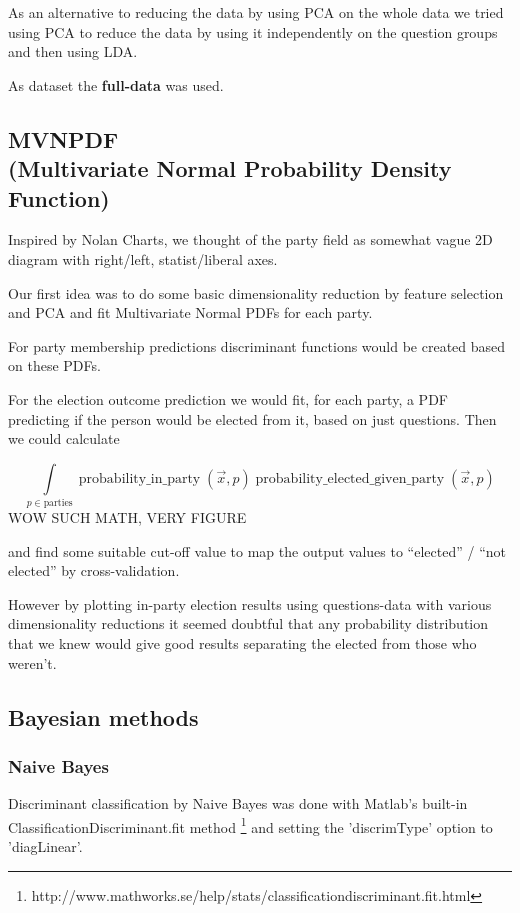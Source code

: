 \documentclass[a4paper,10pt]{article}
\begin{document}
As an alternative to reducing the data by using PCA on the whole data we tried using PCA to reduce the data by using it independently on the question groups and then using LDA.

As dataset the {\bf full-data} was used.

\subsection{MVNPDF\\ {\small (Multivariate Normal Probability Density Function)}}
Inspired by Nolan Charts, we thought of the party field as somewhat vague 2D diagram with right/left, statist/liberal axes.

Our first idea was to do some basic dimensionality reduction by feature selection and PCA and fit Multivariate Normal PDFs for each party.

For party membership predictions discriminant functions would be created based on these PDFs.

For the election outcome prediction we would fit, for each party, a PDF predicting if the person would be elected from it, based on just questions. Then we could calculate

\begin{equation}
\int\limits_{p \in \text{parties}} \operatorname{probability\_in\_party}(\vec{x}, p) \operatorname{probability\_elected\_given\_party}(\vec{x}, p)
\end{equation}
{\small WOW SUCH MATH, VERY FIGURE}

and find some suitable cut-off value to map the output values to “elected” / “not elected” by cross-validation.

However by plotting in-party election results using questions-data with various dimensionality reductions it seemed doubtful that any probability distribution that we knew would give good results separating the elected from those who weren’t.

\subsection{Bayesian methods}
\subsubsection{Naive Bayes}
Discriminant classification by Naive Bayes was done with Matlab’s built-in ClassificationDiscriminant.fit method \footnote{http://www.mathworks.se/help/stats/classificationdiscriminant.fit.html} and setting the 'discrimType' option to 'diagLinear'.
\end{document}
